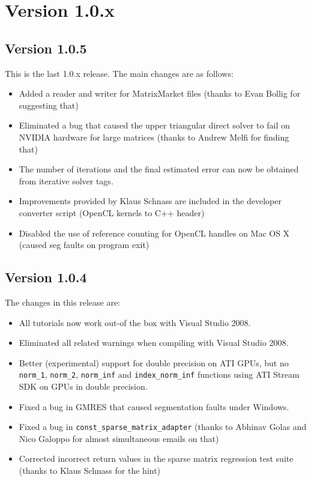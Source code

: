 \section*{Version 1.0.x}

\subsection*{Version 1.0.5} 
This is the last 1.0.x release. The main changes are as follows:
\begin{itemize}
 \item Added a reader and writer for MatrixMarket files (thanks to Evan Bollig for suggesting that)
 \item Eliminated a bug that caused the upper triangular direct solver to fail on NVIDIA hardware for large matrices (thanks to Andrew Melfi for finding that)
 \item The number of iterations and the final estimated error can now be obtained from iterative solver tags.
 \item Improvements provided by Klaus Schnass are included in the developer converter script (OpenCL kernels to C++ header)
 \item Disabled the use of reference counting for OpenCL handles on Mac OS X (caused seg faults on program exit)
\end{itemize}

\subsection*{Version 1.0.4} 
The changes in this release are:
\begin{itemize}
 \item All tutorials now work out-of the box with Visual Studio 2008.
 \item Eliminated all {\ViennaCL} related warnings when compiling with Visual Studio 2008.
 \item Better (experimental) support for double precision on ATI GPUs, but no \texttt{norm\_1}, \texttt{norm\_2}, \texttt{norm\_inf} and \texttt{index\_norm\_inf} functions using ATI Stream SDK on GPUs in double precision.
 \item Fixed a bug in GMRES that caused segmentation faults under Windows.
 \item Fixed a bug in \texttt{const\_sparse\_matrix\_adapter} (thanks to Abhinav Golas and Nico Galoppo for almost simultaneous emails on that)
 \item Corrected incorrect return values in the sparse matrix regression test suite (thanks to Klaus Schnass for the hint)
\end{itemize}

